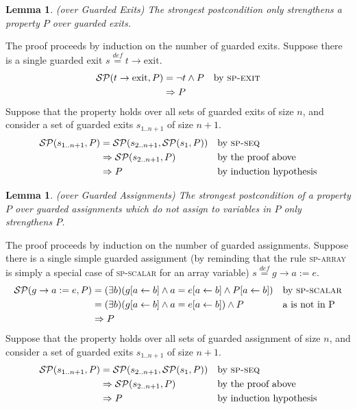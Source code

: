 \documentclass[a4paper,10pt]{article}
\newcommand{\KWexit}{\ensuremath{\mathrm{exit}}}
\newcommand{\symdef}{\ensuremath{\overset{\mathit{def}}{=}}}
\newcommand{\spexit}{\textsc{sp-exit}\xspace}
\newcommand{\spscalar}{\textsc{sp-scalar}\xspace}
\newcommand{\sparray}{\textsc{sp-array}\xspace}
\newcommand{\spseq}{\textsc{sp-seq}\xspace}
\newtheorem{lemma}[theorem]{Lemma}
\newenvironment{proof}[1][Proof.]{\begin{trivlist}
\item[\hskip \labelsep {\bfseries #1}]}{\end{trivlist}}
\begin{document}
\begin{lemma}
  \emph{(\spostsym over Guarded Exits)} The strongest postcondition only
  strengthens a property $P$ over guarded exits.
\label{lemma:sp-g-exits}
\end{lemma}

\begin{proof}
  The proof proceeds by induction on the number of guarded exits. Suppose there
  is a single guarded exit $s \symdef t \rightarrow \KWexit$.
  \begin{align*}
    \spost{t \rightarrow \KWexit}{P} 
    &=\neg t \land P   && \text{by \spexit}\\
    &\Rightarrow P
  \end{align*}
  Suppose that the property holds over all sets of guarded exits of size $n$,
  and consider a set of guarded exits $s_{1..n+1}$ of size $n+1$.
  \begin{align*}
    \spost{s_{1..n+1}}{P} 
    &=\spost{s_{2..n+1}}{\spost{s_1}{P}}  && \text{by \spseq}\\
    &\Rightarrow \spost{s_{2..n+1}}{P}    && \text{by the proof above}\\
    &\Rightarrow P                        && \text{by induction hypothesis}\\
  \end{align*}
\end{proof}

\begin{lemma}
  \emph{(\spostsym over Guarded Assignments)} The strongest postcondition of a
  property $P$ over guarded assignments which do not assign to variables in $P$
  only strengthens $P$.
\label{lemma:sp-g-assignments}
\end{lemma}

\begin{proof}
  The proof proceeds by induction on the number of guarded assignments. Suppose there
  is a single simple guarded assignment (by reminding that the rule \sparray is simply 
  a special case of \spscalar for an array variable) $s \symdef g \rightarrow a := e$.
  \begin{align*}
    \spost{g \rightarrow a:=e}{P} 
    &=(\exists b) (\subst{g}{a}{b} 
    \land a = \subst{e}{a}{b} \land \subst{P}{a}{b}) && \text{by \spscalar}\\
    &=(\exists b) (\subst{g}{a}{b} 
    \land a = \subst{e}{a}{b}) \land P && \text{a is not in P}\\
    &\Rightarrow P
  \end{align*}
  Suppose that the property holds over all sets of guarded assignment of size $n$,
  and consider a set of guarded exits $s_{1..n+1}$ of size $n+1$.
  \begin{align*}
    \spost{s_{1..n+1}}{P} 
    &=\spost{s_{2..n+1}}{\spost{s_1}{P}}  && \text{by \spseq}\\
    &\Rightarrow \spost{s_{2..n+1}}{P}    && \text{by the proof above}\\
    &\Rightarrow P                        && \text{by induction hypothesis}\\
  \end{align*}
\end{proof}
\end{document}
